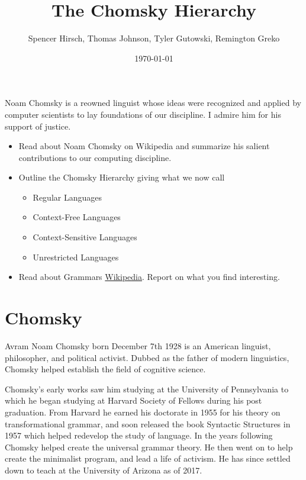 \documentclass{article}
\begin{document}
\title{The Chomsky Hierarchy}
\author{Spencer Hirsch, Thomas Johnson, Tyler Gutowski, Remington Greko}
\date{\today}

\maketitle

\noindent Noam Chomsky is a reowned linguist whose ideas were recognized and applied
by computer scientists to lay foundations of our discipline. I admire him 
for his support of justice.

\begin{itemize}
    \item Read about Noam Chomsky on Wikipedia and summarize his salient 
          contributions to our computing discipline.
    
    \item Outline the Chomsky Hierarchy giving what we now call
        \begin{itemize}
            \item Regular Languages
            \item Context-Free Languages
            \item Context-Sensitive Languages
            \item Unrestricted Languages
        \end{itemize}

    \item Read about Grammars \href{https://en.wikipedia.org/wiki/Grammar}{Wikipedia}. Report on what you find interesting.
\end{itemize}

\section{Chomsky}

\medskip

Avram Noam Chomsky born December 7th 1928 is an American linguist, philosopher, and political activist. 
Dubbed as the father of modern linguistics, Chomsky helped establish the field of cognitive science.
\medskip

Chomsky's early works saw him studying at the University of Pennsylvania to which he began studying at Harvard Society of Fellows during his post graduation. 
From Harvard he earned his doctorate in 1955 for his theory on transformational grammar, and soon released the book Syntactic Structures in 1957 which helped redevelop the study of language. 
In the years following Chomsky helped create the universal grammar theory. He then went on to help create the minimalist program, and lead a life of activism. 
He has since settled down to teach at the University of Arizona as of 2017.
\medskip
\end{document}
